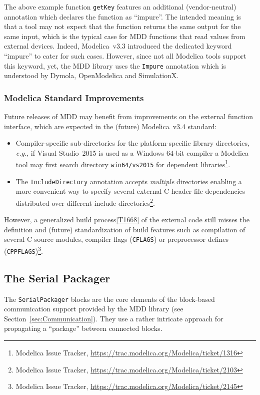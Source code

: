 \documentclass{resources/modelica}
\newcommand{\clang}[1]{\lstinline[language=c]|#1|}
\newcommand{\modelica}[1]{\lstinline[language=modelica]|#1|}
\begin{document}
The above example function \modelica{getKey} features an additional (vendor-neutral) annotation which declares the function
as ``impure''. The intended meaning is that a tool may not expect that the
function returns the same output for the same input, which is the typical case
for MDD functions that read values from external devices. Indeed, Modelica~v3.3 introduced the dedicated keyword
``impure'' to cater for such cases. However, since not all Modelica tools support this
keyword, yet, the MDD library uses the \modelica{Impure} annotation which is understood
by Dymola, OpenModelica and SimulationX.

\subsubsection{Modelica Standard Improvements}

Future releases of MDD may benefit from improvements on the external
function interface, which are expected in the (future) Modelica~v3.4 standard:
\begin{itemize}
 \item Compiler-specific sub-directories for the platform-specific library directories, \textit{e.g.}, if Visual Studio~2015 is used as a Windows 64-bit compiler a Modelica tool may first search directory \modelica{win64/vs2015} for dependent libraries\footnote{Modelica Issue Tracker, \url{https://trac.modelica.org/Modelica/ticket/1316}}.
 \item The \modelica{IncludeDirectory} annotation accepts \emph{multiple} directories enabling a more convenient way to specify several external C header file dependencies distributed over different include directories\footnote{Modelica Issue Tracker, \url{https://trac.modelica.org/Modelica/ticket/2103}}.
\end{itemize}

However, a generalized build process\cref{T1668} of the external code still misses the definition and (future) standardization of build features such as compilation of several C source modules, compiler flags (\clang{CFLAGS}) or preprocessor defines (\clang{CPPFLAGS})\footnote{Modelica Issue Tracker, \url{https://trac.modelica.org/Modelica/ticket/2145}}.

\subsection{The Serial Packager}
\label{sec:SerialPackager}

The \modelica{SerialPackager} blocks are the core elements of the block-based
communication support provided by the MDD library (see
Section~\ref{sec:Communication}). They use a rather intricate approach for
propagating a ``package'' between connected blocks.
\end{document}
